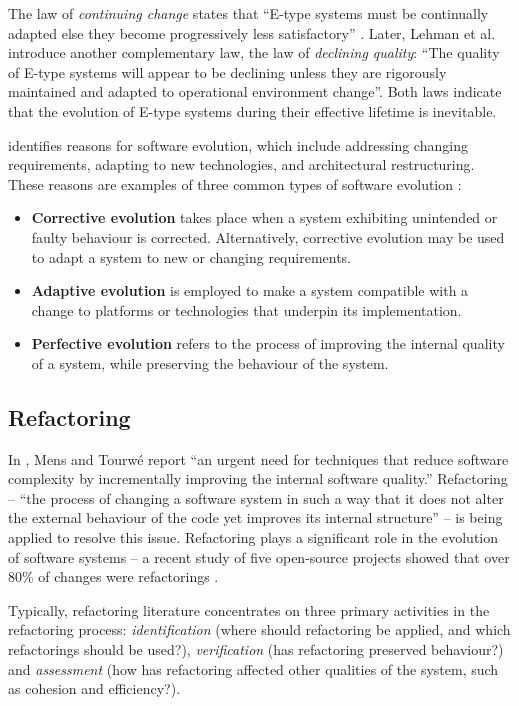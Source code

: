 The law of \textit{continuing change} states that ``E-type systems must be continually adapted else they become progressively less satisfactory'' \cite{lehman78programs}. Later, Lehman et al. \cite{lehman96laws} introduce another complementary law, the law of \textit{declining quality}: ``The quality of E-type systems will appear to be declining unless they are rigorously maintained and adapted to operational environment change''. Both laws indicate that the evolution of E-type systems during their effective lifetime is inevitable. 

\cite{sjoberg93quantifying} identifies reasons for software evolution, which include addressing changing requirements, adapting to new technologies, and architectural restructuring. These reasons are examples of three common types of software evolution \cite[ch. 21]{sommerville06software}:

\begin{itemize}
 \item \textbf{Corrective evolution} takes place when a system exhibiting unintended or faulty behaviour is corrected. Alternatively, corrective evolution may be used to adapt a system to new or changing requirements. 
 \item \textbf{Adaptive evolution} is employed to make a system compatible with a change to platforms or technologies that underpin its implementation.
 \item \textbf{Perfective evolution} refers to the process of improving the internal quality of a system, while preserving the behaviour of the system. 
\end{itemize}


\subsection{Refactoring}
\label{subsec:refactoring}
In \cite{mens04survey}, Mens and Tourw\'{e} report ``an urgent need for techniques that reduce software complexity by incrementally improving the internal software quality.'' Refactoring -- ``the process of changing a software system in such a way that it does not alter the external behaviour of the code yet improves its internal structure'' \cite[pg. xvi]{fowler99refactoring} -- is being applied to resolve this issue. Refactoring plays a significant role in the evolution of software systems -- a recent study of five open-source projects showed that over 80\% of changes were refactorings \cite{dig06apis}.

Typically, refactoring literature concentrates on three primary activities in the refactoring process: \emph{identification} (where should refactoring be applied, and which refactorings should be used?), \emph{verification} (has refactoring preserved behaviour?) and \emph{assessment} (how has refactoring affected other qualities of the system, such as cohesion and efficiency?).

